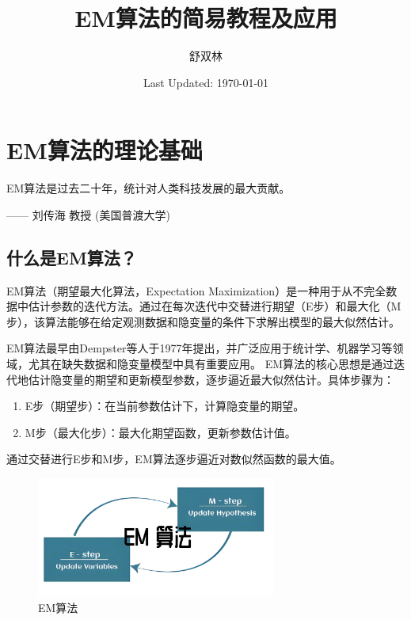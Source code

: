 \documentclass[a4paper,12pt]{ctexart} %
\author{\kaishu 舒双林}
\title{\kaishu EM算法的简易教程及应用}
\date{Last Updated: \today}
\begin{document}
\maketitle
\thispagestyle{empty}
\tableofcontents
\newpage

\section{EM算法的理论基础}
\thispagestyle{plain}
\setcounter{page}{1}
\begin{flushleft}
    {\kaishu EM算法是过去二十年，统计对人类科技发展的最大贡献。}
    \end{flushleft}
    \begin{flushright}
    {\kaishu —— 刘传海 教授 (美国普渡大学)}
    \end{flushright}
\subsection{什么是EM算法？}
EM算法（期望最大化算法，Expectation Maximization）是一种用于从不完全数据中估计参数的迭代方法。通过在每次迭代中交替进行期望（E步）和最大化（M步），该算法能够在给定观测数据和隐变量的条件下求解出模型的最大似然估计。

EM算法最早由Dempster等人于1977年提出，并广泛应用于统计学、机器学习等领域，尤其在缺失数据和隐变量模型中具有重要应用。
EM算法的核心思想是通过迭代地估计隐变量的期望和更新模型参数，逐步逼近最大似然估计。具体步骤为：
\begin{enumerate}
    \item E步（期望步）：在当前参数估计下，计算隐变量的期望。
    \item M步（最大化步）：最大化期望函数，更新参数估计值。
\end{enumerate}
通过交替进行E步和M步，EM算法逐步逼近对数似然函数的最大值。
\begin{figure}[H]
    \centering
    \includegraphics[width=0.7\textwidth]{fig/EM算法.jpg}
    \caption{EM算法}
    \label{fig:em_flowchart}
\end{figure}
\end{document}
